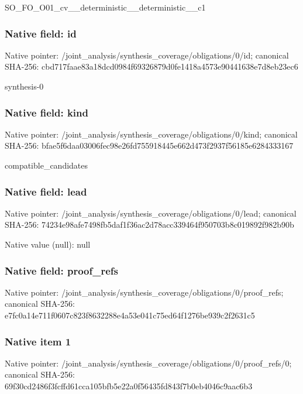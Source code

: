 \documentclass[10pt,a4paper]{article}
\begin{document}
\begingroup\raggedright\sloppy SO\_\allowbreak{}FO\_\allowbreak{}O01\_\allowbreak{}cv\_\allowbreak{}\_\allowbreak{}deterministic\_\allowbreak{}\_\allowbreak{}deterministic\_\allowbreak{}\_\allowbreak{}c1\par\endgroup

\subsubsection{Native field: id}
Native pointer: /joint\_\allowbreak{}analysis/synthesis\_\allowbreak{}coverage/obligations/0/id; canonical SHA-256: cbd717faae83a18dcd0984f69326879d0fe1418a4573e90441638e7d8eb23ec6

\begingroup\raggedright\sloppy synthesis-0\par\endgroup

\subsubsection{Native field: kind}
Native pointer: /joint\_\allowbreak{}analysis/synthesis\_\allowbreak{}coverage/obligations/0/kind; canonical SHA-256: bfae5f6daa03006fec98e26fd755918445e662d473f2937f56185e6284333167

\begingroup\raggedright\sloppy compatible\_\allowbreak{}candidates\par\endgroup

\subsubsection{Native field: lead}
Native pointer: /joint\_\allowbreak{}analysis/synthesis\_\allowbreak{}coverage/obligations/0/lead; canonical SHA-256: 74234e98afe7498fb5daf1f36ac2d78acc339464f950703b8c019892f982b90b

Native value (null): null

\subsubsection{Native field: proof\_\allowbreak{}refs}
Native pointer: /joint\_\allowbreak{}analysis/synthesis\_\allowbreak{}coverage/obligations/0/proof\_\allowbreak{}refs; canonical SHA-256: e7fc0a14e711f0607c823f8632288e4a53e041c75ed64f1276be939c2f2631c5

\subsubsection{Native item 1}
Native pointer: /joint\_\allowbreak{}analysis/synthesis\_\allowbreak{}coverage/obligations/0/proof\_\allowbreak{}refs/0; canonical SHA-256: 69f30cd2486f3fcffd61cca105bfb5e22a0f56435fd843f7b0eb4046c9aac6b3
\end{document}
